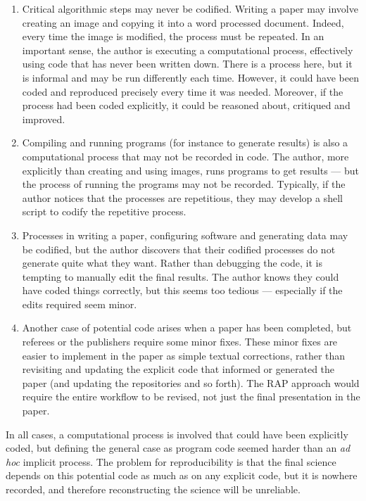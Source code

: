 \documentclass{comjnl}
\begin{document}
\begin{enumerate}\raggedright
\itemsep=1.5ex
\item Critical algorithmic steps may never be codified. Writing a paper may involve creating an image and copying it into a word processed document. Indeed, every time the image is modified, the process must be repeated. In an important sense, the author is executing a computational process, effectively using code that has never been written down. There is a process here, but it is informal and may be run differently each time. However, it could have been coded and reproduced precisely every time it was needed. Moreover, if the process had been coded explicitly, it could be reasoned about, critiqued and improved.

\item Compiling and running programs (for instance to generate results) is also a computational process that may not be recorded in code. The author, more explicitly than creating and using images, runs programs to get results --- but the process of running the programs may not be recorded. Typically, if the author notices that the processes are repetitious, they may develop a shell script to codify the repetitive process. 

\item Processes in writing a paper, configuring software and generating data may be codified, but the author discovers that their codified processes do not generate quite what they want. Rather than debugging the code, it is tempting to manually edit the final results. The author knows they could have coded things correctly, but this seems too tedious --- especially if the edits required seem minor. 

\item Another case of potential code arises when a paper has been completed, but referees or the publishers require some minor fixes. These minor fixes are easier to implement in the paper as simple textual corrections, rather than revisiting and updating the explicit code that informed or generated the paper (and updating the repositories and so forth). The RAP approach would require the entire workflow to be revised, not just the final presentation in the paper.

\end{enumerate}

In all cases, a computational process is involved that could have been explicitly coded, but defining the general case as program code seemed harder than an \emph{ad hoc\/} implicit process. The problem for reproducibility is that the final science depends on this potential code as much as on any explicit code, but it is nowhere recorded, and therefore reconstructing the science will be unreliable.
\end{document}
